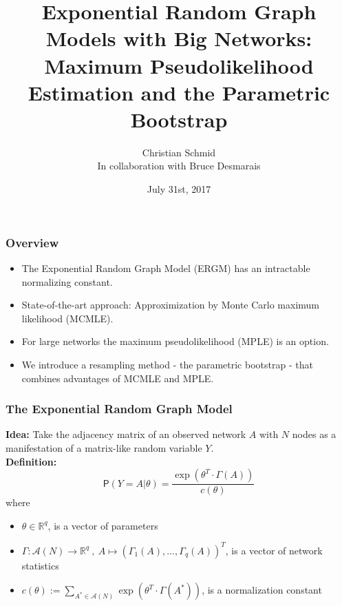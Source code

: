 \documentclass[xcolor=dvipsnames]{beamer}
\title{Exponential Random Graph Models with Big Networks:
Maximum Pseudolikelihood Estimation and the
Parametric Bootstrap }
\author{Christian Schmid\\
In collaboration with Bruce Desmarais}
\institute[The Pennsylvania State University]{The Pennsylvania State University}
\date{July 31st, 2017}
\begin{document}
 
%
%


\begin{frame}
\frametitle{Overview}
\begin{itemize}
\item The Exponential Random Graph Model (ERGM) has an intractable normalizing constant.\\[0.4cm]
\item State-of-the-art approach: Approximization by Monte Carlo maximum likelihood (MCMLE).\\[0.4cm]
\item For large networks the maximum pseudolikelihood (MPLE) is an option.\\[0.4cm]
\item We introduce a resampling method - the parametric bootstrap - that combines advantages of MCMLE and MPLE.
\end{itemize}
\end{frame}



\begin{frame}
\frametitle{The Exponential Random Graph Model}
\textbf{Idea:} Take the adjacency matrix of an observed network $A$ with $N$ nodes as a manifestation of a matrix-like random variable $Y$.\\[0.5cm]
%
\textbf{Definition:} 
$$\mathsf{P} (Y=A| \theta)=\dfrac{\exp(\theta^T \cdot \Gamma(A))}{c(\theta)}$$
%
where 
%
\begin{itemize}
\item $\theta \in \mathbb{R}^q$, is a vector of parameters
\item $\Gamma:\mathcal{A}(N) \to \mathbb{R}^q~,~A \mapsto (\Gamma_1(A),\dots,\Gamma_q(A))^T$, is a vector of network statistics 
\item $c(\theta) :=\sum_{A^* \in \mathcal{A}(N)} \exp(\theta^T \cdot \Gamma(A^*))$, is a normalization constant
\end{itemize}
\end{frame}
\end{document}
